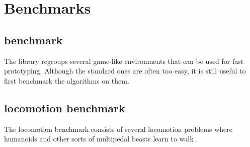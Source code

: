 \chapter{Benchmarks}

\section{\gym benchmark}

The \gym library regroups several game-like environments that can be used for fast prototyping. Although the standard ones are often too easy, it is still useful to first benchmark the algorithms on them.



\section{\mujoco locomotion benchmark}

The \mujoco locomotion benchmark consists of several locomotion problems where humanoids and other sorts of multipedal beasts learn to walk \cite{mujoco}.

